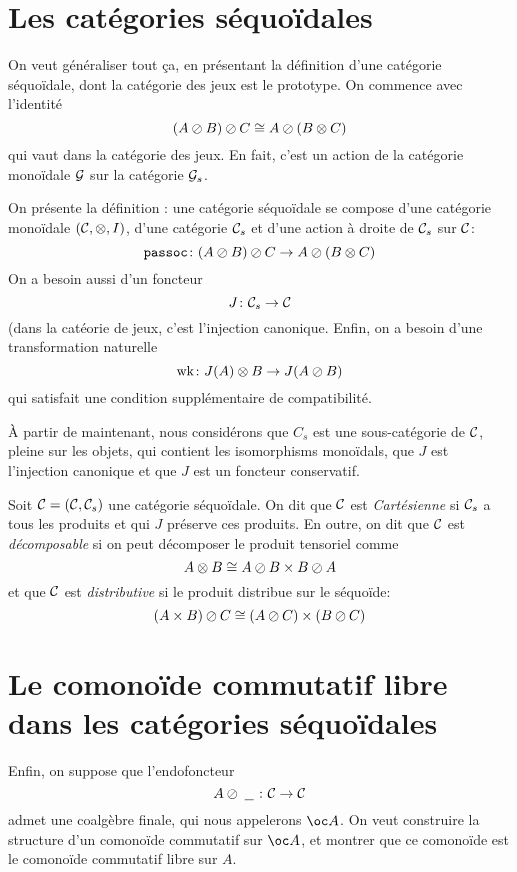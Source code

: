 \documentclass[11pt]{article}
\begin{document}
\section{Les cat\'{e}gories s\'{e}quo\"{i}dales}

On veut g\'{e}n\'{e}raliser tout \c{c}a, en pr\'{e}sentant la d\'{e}finition d'une cat\'{e}gorie s\'{e}quo\"{i}dale, dont la cat\'{e}gorie des jeux est le prototype.  On commence avec l'identit\'{e}
\[
  (A \oslash B) \oslash C \cong A \oslash (B \otimes C)
  \]
qui vaut dans la cat\'{e}gorie des jeux.  En fait, c'est un action de la cat\'{e}gorie mono\"{i}dale $\mathcal G$ sur la cat\'{e}gorie $\mathcal G_s$.  

On pr\'{e}sente la d\'{e}finition : une cat\'{e}gorie s\'{e}quo\"{i}dale se compose d'une cat\'{e}gorie mono\"{i}dale $({\mathcal{C}}, \otimes, I)$, d'une cat\'{e}gorie ${\mathcal{C}}_s$ et d'une action \`{a} droite de ${\mathcal{C}}_s$ sur ${\mathcal{C}}$:
\[
  {\texttt{passoc}} \colon (A\oslash B)\oslash C \to A\oslash(B\otimes C)
  \]
On a besoin aussi d'un foncteur
\[
  J \colon {\mathcal{C}}_s \to {\mathcal{C}}
  \]
(dans la cat\'{e}orie de jeux, c'est l'injection canonique.  Enfin, on a besoin d'une transformation naturelle
\[
  \operatorname{wk} \colon J(A)\otimes B \to J(A\oslash B)
  \]
qui satisfait une condition suppl\'{e}mentaire de compatibilit\'{e}.

\`{A} partir de maintenant, nous consid\'{e}rons que $C_s$ est une sous-cat\'{e}gorie de ${\mathcal{C}}$, pleine sur les objets, qui contient les isomorphisms mono\"{i}dals, que $J$ est l'injection canonique et que $J$ est un foncteur conservatif.

Soit ${\mathcal{C}}=({\mathcal{C}},{\mathcal{C}}_s)$ une cat\'{e}gorie s\'{e}quo\"{i}dale.  On dit que ${\mathcal{C}}$ est \emph{Cart\'{e}sienne} si ${\mathcal{C}}_s$ a tous les produits et qui $J$ pr\'{e}serve ces produits.  En outre, on dit que ${\mathcal{C}}$ est \emph{d\'{e}composable} si on peut d\'{e}composer le produit tensoriel comme
\[
  A\otimes B \cong A\oslash B \times B\oslash A
  \]
et que ${\mathcal{C}}$ est \emph{distributive} si le produit distribue sur le s\'{e}quo\"{i}de:
\[
  (A \times B) \oslash C \cong (A \oslash C) \times (B \oslash C)
  \]

\section{Le comono\"{i}de commutatif libre dans les cat\'{e}gories s\'{e}quo\"{i}dales}

Enfin, on suppose que l'endofoncteur
\[
  A\oslash\;\underline{\hspace{1.5ex}}\; \colon {\mathcal{C}} \to {\mathcal{C}}
  \]
admet une coalg\`{e}bre finale, qui nous appelerons $\oc A$.  On veut construire la structure d'un comono\"{i}de commutatif sur $\oc A$, et montrer que ce comono\"{i}de est le comono\"{i}de commutatif libre sur $A$.  
\end{document}
